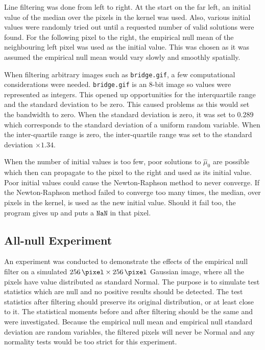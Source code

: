 Line filtering was done from left to right. At the start on the far left, an initial value of the median over the pixels in the kernel was used. Also, various initial values were randomly tried out until a requested number of valid solutions were found. For the following pixel to the right, the empirical null mean of the neighbouring left pixel was used as the initial value. This was chosen as it was assumed the empirical null mean would vary slowly and smoothly spatially.

When filtering arbitrary images such as \texttt{bridge.gif}, a few computational considerations were needed. \texttt{bridge.gif} is an 8-bit image so values were represented as integers. This opened up opportunities for the interquartile range and the standard deviation to be zero. This caused problems as this would set the bandwidth to zero. When the standard deviation is zero, it was set to $0.289$ which corresponds to the standard deviation of a uniform random variable. When the inter-quartile range is zero, the inter-quartile range was set to the standard deviation $\times 1.34$.

When the number of initial values is too few, poor solutions to $\widehat{\mu}_0$ are possible which then can propagate to the pixel to the right and used as its initial value. Poor initial values could cause the Newton-Raphson method to never converge. If the Newton-Raphson method failed to converge too many times, the median, over pixels in the kernel, is used as the new initial value. Should it fail too, the program gives up and puts a $\texttt{NaN}$ in that pixel.

\subsection{All-null Experiment}

An experiment was conducted to demonstrate the effects of the empirical null filter on a simulated $\SI{256}{\pixel}\times\SI{256}{\pixel}$ Gaussian image, where all the pixels have value distributed as standard Normal. The purpose is to simulate test statistics which are null and no positive results should be detected. The test statistics after filtering should preserve its original distribution, or at least close to it. The statistical moments before and after filtering should be the same and were investigated. Because the empirical null mean and empirical null standard deviation are random variables, the filtered pixels will never be Normal and any normality tests would be too strict for this experiment.

